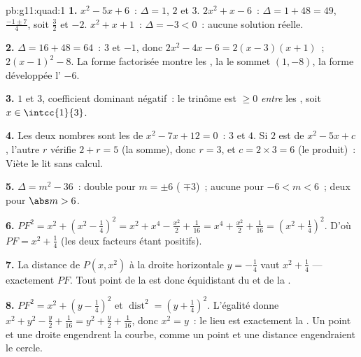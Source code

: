 \begin{solution}{pb:g11:quad:1}
\textbf{1.} $x^2 - 5x + 6$~: $\Delta = 1$,  $2$ et $3$.
$2x^2 + x - 6$~: $\Delta = 1 + 48 = 49$, 
$\frac{-1 \pm 7}{4}$, soit $\frac32$ et $-2$. $x^2 + x + 1$~:
$\Delta = -3 < 0$~: aucune solution réelle.

\textbf{2.} $\Delta = 16 + 48 = 64$~:  $3$ et $-1$, donc
$2x^2 - 4x - 6 = 2(x - 3)(x + 1)$~; 
$2(x - 1)^2 - 8$. La forme factorisée montre les , la  le sommet $(1, -8)$, la forme développée l' $-6$.

\textbf{3.}  $1$ et $3$, coefficient dominant négatif~: le
trinôme est $\geq 0$ \emph{entre} les , soit
$x \in \intcc{1}{3}$.

\textbf{4.} Les deux nombres sont les  de
$x^2 - 7x + 12 = 0$~: $3$ et $4$. Si $2$ est  de
$x^2 - 5x + c$, l'autre  $r$ vérifie $2 + r = 5$ (la somme),
donc $r = 3$, et $c = 2 \times 3 = 6$ (le produit)~: Viète le lit
sans calcul.

\textbf{5.} $\Delta = m^2 - 36$~:  double pour $m = \pm 6$
( $\mp 3$)~; aucune  pour $-6 < m < 6$~; deux 
pour $\abs m > 6$.

\textbf{6.} $PF^2 = x^2 + \left(x^2 - \frac14\right)^2
= x^2 + x^4 - \frac{x^2}{2} + \frac{1}{16}
= x^4 + \frac{x^2}{2} + \frac{1}{16}
= \left(x^2 + \frac14\right)^2$. D'où
$PF = x^2 + \frac14$ (les deux facteurs étant positifs).

\textbf{7.} La distance de $P(x, x^2)$ à la droite horizontale
$y = -\frac14$ vaut $x^2 + \frac14$ --- exactement $PF$. Tout point
de la  est donc équidistant du  et de la .

\textbf{8.} $PF^2 = x^2 + \left(y - \frac14\right)^2$ et
$\operatorname{dist}^2 = \left(y + \frac14\right)^2$. L'égalité
donne $x^2 + y^2 - \frac y2 + \frac{1}{16} = y^2 + \frac y2 +
\frac1{16}$, donc $x^2 = y$~: le lieu est exactement la . Un
point et une droite engendrent la courbe, comme un point et une
distance engendraient le cercle.


\end{solution}
